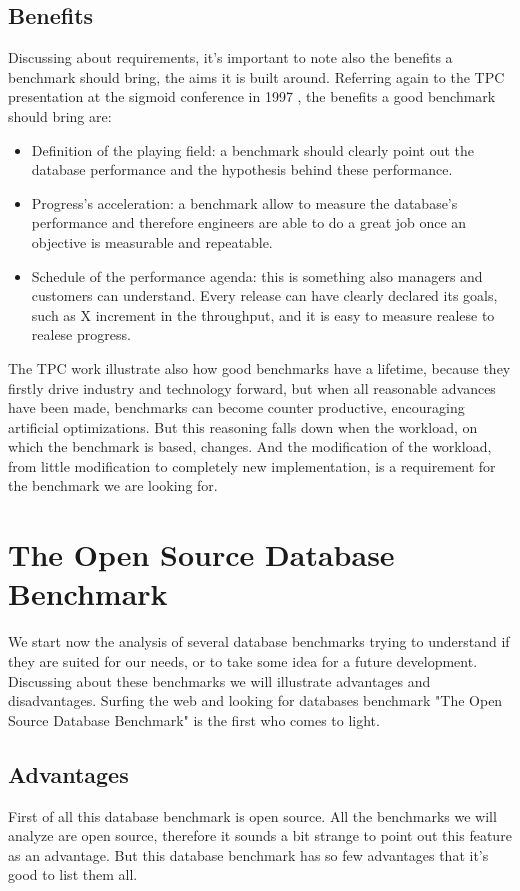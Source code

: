 		\subsection{Benefits}
Discussing about requirements, it's important to note also the benefits a benchmark should bring, the aims it is built around. Referring again to the TPC presentation at the sigmoid conference in 1997 \cite{tpc/sigmoid}, the benefits a good benchmark should bring are:
\begin{itemize}
	\item Definition of the playing field: a benchmark should clearly point out the database performance and the hypothesis behind these performance.
	\item Progress's acceleration: a benchmark allow to measure the database's performance and therefore engineers are able to do a great job once an objective is measurable and repeatable.
	\item Schedule of the performance agenda: this is something also managers and customers can understand. Every release can have clearly declared its goals, such as X increment in the throughput, and it is easy to measure realese to realese progress.
\end{itemize}

The TPC work illustrate also how good benchmarks have a lifetime, because they firstly drive industry and technology forward, but when all reasonable advances have been made, benchmarks can become counter productive, encouraging artificial optimizations. But this reasoning falls down when the workload, on which the benchmark is based, changes. And the modification of the workload, from little modification to completely new implementation, is a requirement for the benchmark we are looking for.
	
	\section{The Open Source Database Benchmark}
We start now the analysis of several database benchmarks trying to understand if they are suited for our needs, or to take some idea for a future development. Discussing about these benchmarks we will illustrate advantages and disadvantages. Surfing the web and looking for databases benchmark "The Open Source Database Benchmark" is the first who comes to light. 

		\subsection{Advantages}
First of all this database benchmark is open source. All the benchmarks we will analyze are open source, therefore it sounds a bit strange to point out this feature as an advantage. But this database benchmark has so few advantages that it's good to list them all.

